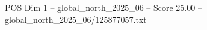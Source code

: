 \begin{textsample}{POS Dim 1 – global\_north\_2025\_06 – Score 25.00 – global\_north\_2025\_06/125877057.txt}
\end{textsample}
